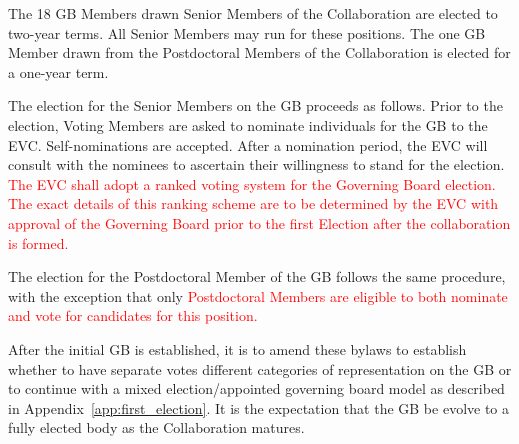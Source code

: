 \documentclass[12pt]{article}
\newcommand{\exec}{{Executive Team}}
\begin{document}
The 18 GB Members drawn Senior Members of the Collaboration are elected to two-year terms.  All Senior Members may  run for these positions. The one GB Member drawn from the Postdoctoral Members of the Collaboration is elected for a one-year term.

The election for the Senior Members on the GB proceeds as follows. 
Prior to the election, Voting Members are asked to nominate individuals for the GB to the EVC.   Self-nominations are accepted. After a nomination period, the EVC will consult with the nominees to ascertain their willingness to stand for the election.
\textcolor{red}{The EVC shall adopt a ranked voting system for the Governing Board election.  The exact details of this ranking scheme are to be determined by the EVC with approval of the Governing Board prior to the first Election after the collaboration is formed. }



The election for the Postdoctoral Member of the GB follows the same procedure, with the exception that only \textcolor{red}{Postdoctoral Members are eligible to both nominate and vote for candidates for this position.} 

After the initial GB is established, it is to amend these bylaws to establish whether to have separate votes different categories of representation on the GB or to continue with a mixed election/appointed governing board model as described in Appendix~\ref{app:first_election}. It is the expectation that the GB be evolve to a fully elected body as the Collaboration matures.
\end{document}
